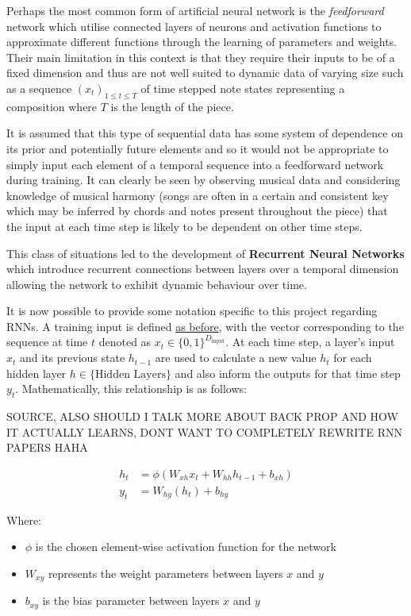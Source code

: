 \documentclass[12pt,]{article}
\providecommand{\tightlist}{%
  \setlength{\itemsep}{0pt}\setlength{\parskip}{0pt}}
\begin{document}
Perhaps the most common form of artificial neural network is the
\emph{feedforward} network which utilise connected layers of neurons and
activation functions to approximate different functions through the
learning of parameters and weights. Their main limitation in this
context is that they require their inputs to be of a fixed dimension and
thus are not well suited to dynamic data of varying size such as a
sequence \((x_t)_{1\le t\le T}\) of time stepped note states
representing a composition where \(T\) is the length of the piece.

It is assumed that this type of sequential data has some system of
dependence on its prior and potentially future elements and so it would
not be appropriate to simply input each element of a temporal sequence
into a feedforward network during training. It can clearly be seen by
observing musical data and considering knowledge of musical harmony
(songs are often in a certain and consistent key which may be inferred
by chords and notes present throughout the piece) that the input at each
time step is likely to be dependent on other time steps.

This class of situations led to the development of \textbf{Recurrent
Neural Networks} which introduce recurrent connections between layers
over a temporal dimension allowing the network to exhibit dynamic
behaviour over time.

It is now possible to provide some notation specific to this project
regarding RNNs. A training input is defined
\protect\hyperlink{buildinganeffectiverepresentation}{as before}, with
the vector corresponding to the sequence at time \(t\) denoted as
\(x_t\in \{0,1\}^{D_{\text{input}}}\). At each time step, a layer's
input \(x_t\) and its previous state \(h_{t-1}\) are used to calculate a
new value \(h_t\) for each hidden layer \(h\in\{\text{Hidden Layers}\}\)
and also inform the outputs for that time step \(y_t\). Mathematically,
this relationship is as follows:

SOURCE, ALSO SHOULD I TALK MORE ABOUT BACK PROP AND HOW IT ACTUALLY
LEARNS, DONT WANT TO COMPLETELY REWRITE RNN PAPERS HAHA

\[\begin{aligned}
h_t &= \phi(W_{xh} x_t + W_{hh} h_{t-1} + b_{xh}) \\
y_t &= W_{hy}(h_t) + b_{hy}
\end{aligned}\]

Where:

\begin{itemize}
\tightlist
\item
  \(\phi\) is the chosen element-wise activation function for the
  network
\item
  \(W_{xy}\) represents the weight parameters between layers \(x\) and
  \(y\)
\item
  \(b_{xy}\) is the bias parameter between layers \(x\) and \(y\)
\end{itemize}
\end{document}
